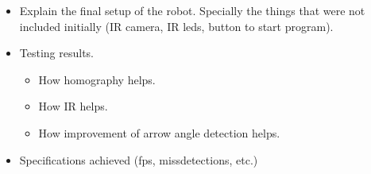 \begin{itemize}
\item
Explain the final setup of the robot. Specially the things that were not included initially (IR camera, IR leds, button to start program).
\item
Testing results.
	\begin{itemize}
	\item
	How homography helps.
	\item
	How IR helps.
	\item
	How improvement of arrow angle detection helps.
	\end{itemize}
\item
Specifications achieved (fps, missdetections, etc.)
\end{itemize}